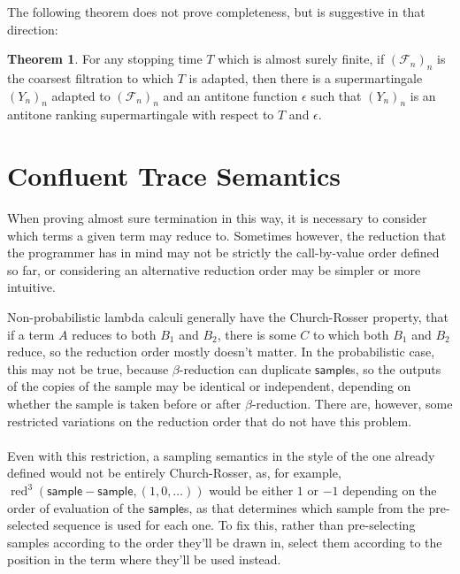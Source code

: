 \documentclass{article}
\newcommand\calF{\mathcal{F}}
\newcommand{\tsample}{\mathsf{sample}}
\DeclareMathOperator{\red}{red}
\theoremstyle{definition}
\theoremstyle{lemma}
\newtheorem{theorem}{Theorem}
\theoremstyle{remark}
\begin{document}
The following theorem does not prove completeness, but is suggestive in that direction:
\begin{theorem}
For any stopping time $T$ which is almost surely finite, if $(\calF_n)_n$ is the coarsest filtration to which $T$ is adapted, then there is a supermartingale $(Y_n)_n$ adapted to $(\calF_n)_n$ and an antitone function $\epsilon$ such that $(Y_n)_n$ is an antitone ranking supermartingale with respect to $T$ and $\epsilon$.
\end{theorem}





\section{Confluent Trace Semantics}
When proving almost sure termination in this way, it is necessary to consider which terms a given term may reduce to. Sometimes however, the reduction that the programmer has in mind may not be strictly the call-by-value order defined so far, or considering an alternative reduction order may be simpler or more intuitive.

Non-probabilistic lambda calculi generally have the Church-Rosser property, that if a term $A$ reduces to both $B_1$ and $B_2$, there is some $C$ 
to which both $B_1$ and $B_2$ reduce,
so the reduction order mostly doesn't matter. 
In the probabilistic case, this may not be true, because $\beta$-reduction can duplicate $\tsample$s, so the outputs of the copies of the sample may be identical or independent, depending on whether the sample is taken before or after $\beta$-reduction. 
There are, however, some restricted variations on the reduction order that do not have this problem.

\paragraph{}
Even with this restriction, a sampling semantics in the style of the one already defined would not be entirely Church-Rosser, as, for example, $\red^3(\tsample - \tsample, (1,0,\dots))$ would be either $1$ or $-1$ depending on the order of evaluation of the $\tsample$s, as that determines which sample from the pre-selected sequence is used for each one. To fix this, rather than pre-selecting samples according to the order they'll be drawn in, select them according to the position in the term where they'll be used instead.
\end{document}
